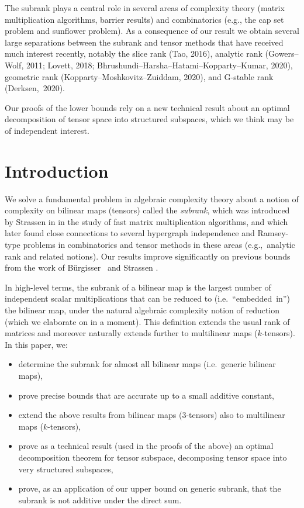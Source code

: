 \documentclass[11pt]{article}
\theoremstyle{definition}
\theoremstyle{remark}
\begin{document}
The subrank plays a central role in several areas of complexity theory (matrix multiplication algorithms, barrier results) and combinatorics (e.g., the cap set problem and sunflower problem).
As a consequence of our result we obtain several large separations between the subrank and tensor methods that have received much interest recently, notably the slice rank (Tao, 2016), analytic rank (Gowers--Wolf, 2011; Lovett, 2018; Bhrushundi--Harsha--Hatami--Kopparty--Kumar, 2020), geometric rank (Kopparty--Moshkovitz--Zuiddam, 2020), and G-stable rank (Derksen,~2020).

Our proofs of the lower bounds rely on a new technical result about an optimal decomposition of tensor space into structured subspaces, which we think may be of independent interest. 

\thispagestyle{empty}
%
\newpage
\restoregeometry

\tableofcontents
%
\newpage

\section{Introduction}

We solve a fundamental problem in algebraic complexity theory about a notion of complexity on bilinear maps (tensors) called the \emph{subrank}, which was introduced by Strassen in \cite{strassen1987relative} in the study of fast matrix multiplication algorithms, and which later found close connections to several hypergraph independence and Ramsey-type problems in combinatorics and tensor methods in these areas (e.g.,~analytic rank \cite{lovett2019analytic,bhrushundi2018multilinear} and related notions). 
Our results improve significantly on previous bounds from the work of 
Bürgisser~\cite{burg} and Strassen \cite{strassen1991degeneration}.

In high-level terms, the subrank of a bilinear map is the largest number of independent scalar multiplications that can be reduced to (i.e.~``embedded~in'') the bilinear map, under the natural algebraic complexity notion of reduction (which we elaborate on in a moment). This definition extends the usual rank of matrices and moreover naturally extends further to multilinear maps ($k$-tensors).
In this paper, we:
\begin{itemize}
    \item determine the subrank for almost all bilinear maps (i.e.~generic bilinear maps),
    \item prove precise bounds that are accurate up to a small additive constant,
    \item extend the above results from bilinear maps ($3$-tensors) also to multilinear maps (\mbox{$k$-tensors}),
    \item prove as a technical result (used in the proofs of the above) an optimal decomposition theorem for tensor subspace, decomposing tensor space into very structured subspaces,
    \item prove, as an application of our upper bound on generic subrank, that the subrank is not additive under the direct sum.
\end{itemize} 
\end{document}
